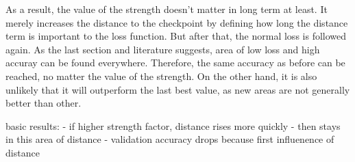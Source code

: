 As a result, the value of the strength doesn't matter in long term at least. It
merely increases the distance to the checkpoint by defining how long the
distance term is important to the loss function. But after that, the normal loss
is followed again. As the last section and literature suggests, area of low loss
and high accuray can be found everywhere. Therefore, the same accuracy as before
can be reached, no matter the value of the strength. On the other hand, it is
also unlikely that it will outperform the last best value, as new areas are not
generally better than other.

basic results:
- if higher strength factor, distance rises more quickly
- then stays in this area of distance
- validation accuracy drops because first influenence of distance




